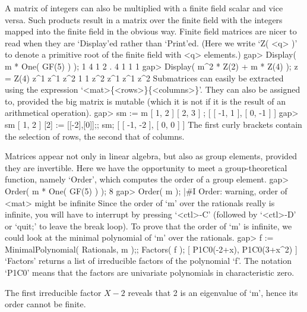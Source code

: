 A matrix  of integers can  also be multiplied with  a finite field scalar
and vice  versa. Such products result in  a matrix  over the finite field
with the integers mapped into the finite field in the obvious way. Finite
field matrices  are nicer to read when  they are  `Display'ed rather than
`Print'ed. (Here  we write `Z(  <q> )' to denote a  primitive root of the
finite field with <q> elements.)
\beginexample
    gap> Display( m * One( GF(5) ) );
     1 4 1
     2 . 4
     1 1 1
    gap> Display( m^2 * Z(2) + m * Z(4) );
    z = Z(4)
     z^1 z^1 z^2
       1   1 z^2
     z^1 z^1 z^2
\endexample
Submatrices    can  easily     be    extracted  using    the   expression
`<mat>\{<rows>\}\{<columns>\}'. They   can also be  assigned to, provided
the big matrix  is mutable (which  it is not if it  is  the result of  an
arithmetical operation).
\beginexample
    gap> sm := m{ [ 1, 2 ] }{ [ 2, 3 ] };
    [ [ -1, 1 ], [ 0, -1 ] ]
    gap> sm{ [ 1, 2 ] }{ [2] } := [[-2],[0]];;  sm;
    [ [ -1, -2 ], [ 0, 0 ] ]
\endexample
The first curly brackets contain the selection of rows,
the second that of columns.

Matrices appear not only in linear algebra, but also as group elements,
provided they are invertible.
Here we have the opportunity to meet a group-theoretical function,
namely `Order', which computes the order of a group element.
\begintt
    gap> Order( m * One( GF(5) ) );
    8
    gap> Order( m );
    |#I  Order: warning, order of <mat> might be infinite
\endtt
Since the order  of `m' over the  rationals really is  infinite, you will
have to interrupt {\GAP} by  pressing `<ctl>-C' (followed by `<ctl>-D' or
`quit;'  to leave the   break loop). To prove  that  the order of `m'  is
infinite,  we  could look  at  the  minimal  polynomial  of `m'  over the
rationals.
\beginexample
    gap> f := MinimalPolynomial( Rationals, m );;  Factors( f );
    [ P1C0(-2+x), P1C0(3+x^2) ]
\endexample
`Factors'  returns a list of  irreducible factors  of the polynomial `f'.
The notation `P1C0' means that  the factors are univariate polynomials in
characteristic zero.

The first  irreducible factor $X-2$ reveals   that 2 is an  eigenvalue of
`m', hence its order cannot be finite.

\null


